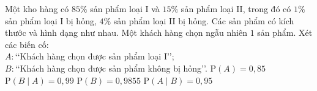 
\begin{ex}%
	Một kho hàng có $85 \%$ sản phẩm loại I và $15 \%$ sản phẩm loại II, trong đó có $1 \%$ sản phẩm loại I bị hỏng, $4 \%$  sản phẩm loại II bị hỏng. Các sản phẩm có kích thước và hình dạng như nhau. Một khách hàng chọn ngẫu nhiên $1$ sản phẩm. Xét các biến cố:\\
	$A\colon$\lq\lq Khách  hàng chọn được sản phẩm loại I\rq\rq;\\
	$B\colon$\lq\lq  Khách hàng chọn được sản phẩm không bị hỏng\rq\rq.
	 \choiceTF
		 {\True $\mathrm{P}(A)=0{,}85$}
		{\True  $\mathrm{P}(B \mid A)=0{,}99$}
		{\True  $\mathrm{P}(B)=0{,}9855$}
		{$\mathrm{P}(A \mid  B)=0{,}95$}
\end{ex}

